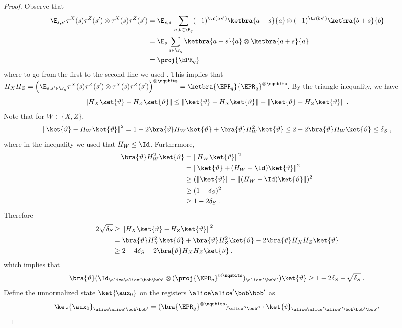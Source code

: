 \begin{proof}
Observe that
\begin{align*}
	\E_{s,s'} \tau^X(s) \tau^Z(s') \otimes \tau^X(s) \tau^Z(s') &= \E_{s,s'} \sum_{a,b \in \F_q} (-1)^{\tr(as')} \ketbra{a+s}{a} \otimes (-1)^{\tr(bs')} \ketbra{b+s}{b} \\
	&= \E_{s} \sum_{a\in \F_q} \ketbra{a+s}{a} \otimes \ketbra{a+s}{a} \\
	&= \proj{\EPR_q}
\end{align*}
where to go from the first to the second line we used . This implies that $H_X H_Z = \Big ( \E_{s,s' \in \F_q} \tau^X(s)\tau^Z(s') \otimes \tau^X(s)\tau^Z(s') \Big)^{\otimes \nqubits} = \ketbra{\EPR_q}{\EPR_q}^{\otimes \nqubits}$.
By the triangle inequality, we have
\[
	\left \| H_X \ket{\vartheta} - H_Z \ket{\vartheta} \right\| \leq \left \| \ket{\vartheta} - H_X \ket{\vartheta} \right\| + \left \| \ket{\vartheta} - H_Z \ket{\vartheta} \right\|\;.
\]
Note that for $W \in \{X,Z\}$,
\[
	\left \| \ket{\vartheta} - H_W \ket{\vartheta} \right\|^2 = 1 - 2\bra{\vartheta} H_W \ket{\vartheta} + \bra{\vartheta} H_W^2 \ket{\vartheta} \leq 2 - 2\bra{\vartheta} H_W \ket{\vartheta} \leq \delta_S\;,
\]
where in the inequality we used that $H_W \leq \Id$. Furthermore,
\begin{align*}
	\bra{\vartheta} H_W^2 \ket{\vartheta} &=\| H_W \ket{\vartheta} \|^2\\
	 &= \| \ket{\vartheta} + (H_W - \Id) \ket{\vartheta} \|^2 \\
	 &\geq (\|\ket{\vartheta}\| - \| (H_W - \Id) \ket{\vartheta} \|)^2 \\
	 &\geq (1 - \delta_S)^2 \\
	 &\geq 1 - 2\delta_S\;. 
\end{align*}
Therefore 
\begin{align*}
2\sqrt{\delta_S} &\geq \left \| H_X \ket{\vartheta} - H_Z \ket{\vartheta} \right\|^2  \\
&= \bra{\vartheta} H_X^2 \ket{\vartheta} + \bra{\vartheta} H_Z^2 \ket{\vartheta} - 2\bra{\vartheta} H_X H_Z \ket{\vartheta} \\
&\geq 2 - 4\delta_S - 2\bra{\vartheta} H_X H_Z \ket{\vartheta} \;,
\end{align*}
which implies that 
\[
	\bra{\vartheta} (\Id_{\alice \alice' \bob \bob'} \otimes (\proj{\EPR_q}^{\otimes \nqubits})_{\alice'' \bob''}) \ket{\vartheta} \geq 1 - 2\delta_S - \sqrt{\delta_S} \;.
\]
Define the unnormalized state $\ket{\aux_0}$ on the registers $\alice \alice' \bob \bob'$ as
\[
	\ket{\aux_0}_{\alice \alice' \bob \bob'} = (\bra{\EPR_q}^{\otimes \nqubits})_{\alice'' \bob''} \cdot \ket{\vartheta}_{\alice \alice' \alice'' \bob \bob' \bob''}
\]
\end{proof}
